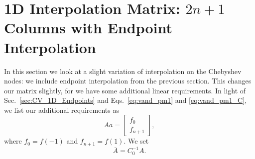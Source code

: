 \section{1D \CV{} Interpolation Matrix: $2n+1$ Columns with
Endpoint Interpolation}
\label{sec:CV_1D_2n_E}

In this section we look at a slight variation of interpolation
on the Chebyshev nodes: we include endpoint interpolation
from the previous section.
This changes our \CV{} matrix slightly, for we have
some additional linear requirements.
In light of Sec.~\ref{sec:CV_1D_Endpoints}
and Eqs.~\eqref{eq:vand_pm1} and \eqref{eq:vand_pm1_C}, we list our
additional requirements as
%
\begin{equation}
    Aa = \begin{bmatrix} f_{0} \\ f_{n+1} \end{bmatrix},
\end{equation}
%
where $f_{0} = f(-1)$ and $f_{n+1} = f(1)$.
We set
%
\begin{equation}
    \overline{A} = C_{0}^{-1}A.
\end{equation}

